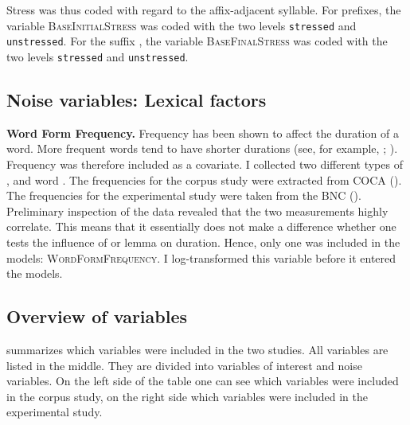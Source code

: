 Stress was thus coded with regard to the affix-adjacent syllable. For prefixes, the variable \textsc{BaseInitialStress} was coded with the two levels \texttt{stressed} and \texttt{unstressed}. For the suffix , the variable \textsc{BaseFinalStress} was coded with the two levels \texttt{stressed} and \texttt{unstressed}.



\subsection{Noise variables: Lexical factors}


\textbf{Word Form Frequency.}					
Frequency has been shown to affect the duration of a word. More frequent words tend to have shorter durations (see, for example, \citealt{Aylett.2004}; \citealt{Gahl.2008}). Frequency was therefore included as a covariate. I collected two different types of ,  and word . 
The frequencies for the corpus study were extracted from  {COCA} (\citealt{Davies.20082014}). The frequencies for the experimental study were taken from the BNC (\citealt{Davies.2004}).
Preliminary inspection of the data revealed that the two  measurements highly correlate. This means that it essentially does not make a difference whether one tests the influence of  or lemma  on duration. Hence, only one was included in the models: \textsc{WordFormFrequency}. I log-transformed this variable before it entered the models.

\subsection{Overview of variables}
		
 summarizes which variables were included in the two studies. All variables are listed in the middle. They are divided into variables of interest and noise variables. On the left side of the table one can see which variables were included in the corpus study, on the right side which variables were included in the experimental study.  



